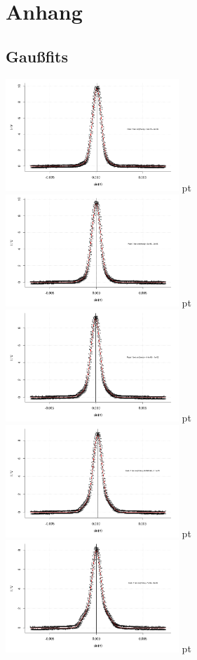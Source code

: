 \documentclass[12pt]{article}
\begin{document}
\newpage
\section{Anhang} 
\subsection{Gaußfits}
\label{fitergebnisse}
\begin{minipage}[h!]{\textwidth}
	\centering
	\includegraphics[width=0.49\textwidth]{figures/ultraschall1.png} pt
	\includegraphics[width=0.49\textwidth]{figures/ultraschall2.png} pt
	\includegraphics[width=0.49\textwidth]{figures/ultraschall3.png} pt
	\includegraphics[width=0.49\textwidth]{figures/ultraschall4.png} pt
	\includegraphics[width=0.49\textwidth]{figures/ultraschall5.png} pt

\end{minipage}
\end{document}
